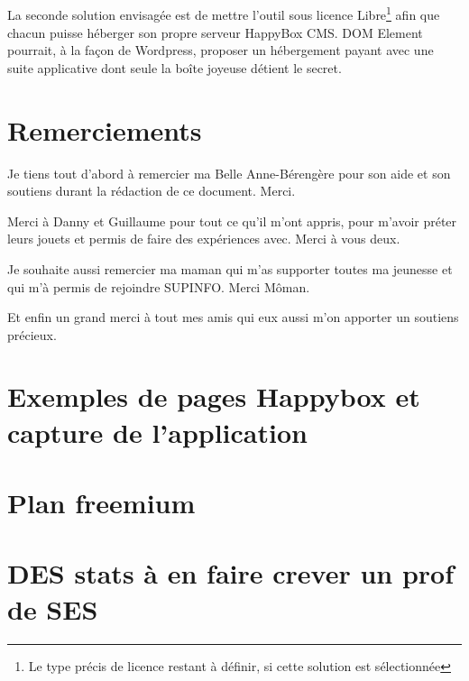 \documentclass[11pt, a4paper ]{article}
\let\stdsection\section
\renewcommand\section{\newpage\stdsection}
\begin{document}
\begin{spacing}{1.5}
\subparagraph{} 
La seconde solution envisagée est de mettre l'outil sous licence Libre\footnote{Le type précis de licence restant à définir, si cette solution est sélectionnée} afin que chacun puisse héberger son propre serveur HappyBox CMS. DOM Element pourrait, à la façon de Wordpress, proposer un hébergement payant avec une suite applicative dont seule la boîte joyeuse détient le secret.


\section{Remerciements}

Je tiens tout d'abord à remercier ma Belle Anne-Bérengère pour son aide et son soutiens durant la rédaction de ce document. Merci. 

Merci à Danny et Guillaume pour tout ce qu'il m'ont appris, pour m'avoir préter leurs jouets et permis de faire des expériences avec. Merci à vous deux.

Je souhaite aussi remercier ma maman qui m'as supporter toutes ma jeunesse et qui m'à permis de rejoindre SUPINFO. Merci Môman.

Et enfin un grand merci à tout mes amis qui eux aussi m'on apporter un soutiens précieux.

	

	\appendix
	\section{Exemples de pages Happybox et capture de l'application}

	\section{Plan freemium}

	\section{DES stats à en faire crever un prof de SES}

	\printindex

	
	
\end{spacing}
\end{document}
